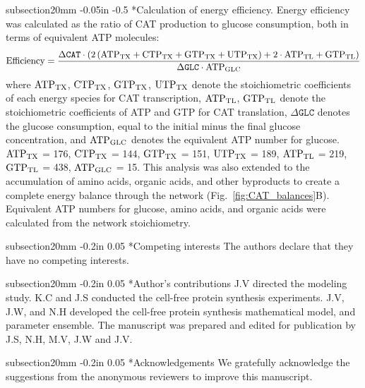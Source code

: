 \documentclass[12pt]{article}
\makeatletter
\renewcommand\subsection{\@startsection
	{subsection}{2}{0mm}
	{-0.05in}
	{-0.5\baselineskip}
	{\normalfont\normalsize\bfseries}}
\renewcommand\section{\@startsection
	{subsection}{2}{0mm}
	{-0.2in}
	{0.05\baselineskip}
	{\normalfont\large\bfseries}}
\makeatother
\begin{document}
\subsection*{Calculation of energy efficiency.}
Energy efficiency was calculated as the ratio of CAT production to glucose consumption, both in terms of equivalent ATP molecules:
\begin{equation}\label{eqn:energy-efficiency-definition}
	\rm Efficiency=\frac{\Delta\texttt{CAT}\cdot \left(2\left({ATP}_{TX}+\rm {CTP}_{TX}+\rm {GTP}_{TX}+\rm {UTP}_{TX}\right)+\rm2\cdot\rm {ATP}_{TL}+\rm {GTP}_{TL}\right)}{\Delta\texttt{GLC}\cdot \rm {ATP}_{GLC}}
\end{equation}
where $\rm {ATP}_{TX}$, $\rm {CTP}_{TX}$, $\rm {GTP}_{TX}$, $\rm {UTP}_{TX}$ denote the stoichiometric coefficients of each energy species for CAT transcription, $\rm {ATP}_{TL}$, $\rm {GTP}_{TL}$ denote the stoichiometric coefficients of ATP and GTP for CAT translation, $\Delta\texttt{GLC}$ denotes the glucose consumption, equal to the initial minus the final glucose concentration, and $\rm {ATP}_{GLC}$ denotes the equivalent ATP number for glucose.
$\rm {ATP}_{TX}$ = 176, $\rm {CTP}_{TX}$ = 144, $\rm {GTP}_{TX}$ = 151, $\rm {UTP}_{TX}$ = 189, $\rm {ATP}_{TL}$ = 219, $\rm {GTP}_{TL}$ = 438, $\rm {ATP}_{GLC}$ = 15.
This analysis was also extended to the accumulation of amino acids, organic acids, and other byproducts to create a complete energy balance through the network (Fig.~\ref{fig:CAT_balances}B).
Equivalent ATP numbers for glucose, amino acids, and organic acids were calculated from the network stoichiometry.

\clearpage

\section*{Competing interests}
The authors declare that they have no competing interests.

\section*{Author's contributions}
J.V directed the modeling study.
K.C and J.S conducted the cell-free protein synthesis experiments.
J.V, J.W, and N.H developed the cell-free protein synthesis mathematical model, and parameter ensemble.
The manuscript was prepared and edited for publication by J.S, N.H, M.V, J.W and J.V.

\section*{Acknowledgements}
We gratefully acknowledge the suggestions from the anonymous reviewers to improve this manuscript.
\end{document}
